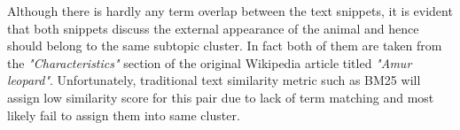Although there is hardly any term overlap between the text snippets, it is evident that both snippets discuss the external appearance of the animal and hence should belong to the same subtopic cluster. In fact both of them are taken from the \textit{"Characteristics"} section of the original Wikipedia article titled \textit{"Amur leopard"}. Unfortunately, traditional text similarity metric such as BM25 will assign low similarity score for this pair due to lack of term matching and most likely fail to assign them into same cluster.





